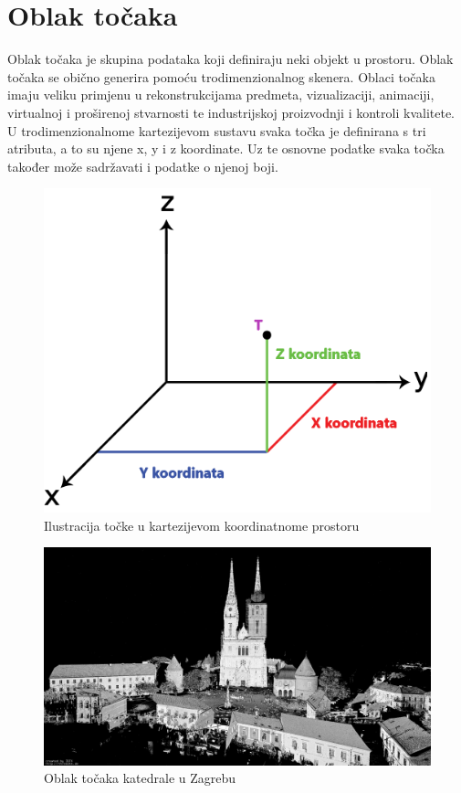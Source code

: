 \section{Oblak točaka}

Oblak točaka je skupina podataka koji definiraju neki objekt u prostoru. Oblak točaka se obično generira pomoću trodimenzionalnog skenera. Oblaci točaka imaju veliku primjenu u rekonstrukcijama predmeta, vizualizaciji, animaciji, virtualnoj i proširenoj stvarnosti te industrijskoj proizvodnji i kontroli kvalitete. U trodimenzionalnome kartezijevom sustavu svaka točka je definirana s tri atributa, a to su njene x, y i z koordinate. Uz te osnovne podatke svaka točka također može sadržavati i podatke o njenoj boji.

\begin{figure}[h!]
  \centering
  \includegraphics[scale=0.3]{images/point-coordinates.png}
  \caption{Ilustracija točke u kartezijevom koordinatnome prostoru}
  \label{fig:point_coordinates}
\end{figure}

\begin{figure}[h!]
  \centering
  \includegraphics[scale=0.2]{images/katedrala-point-cloud.jpg}
  \caption{Oblak točaka katedrale u Zagrebu\cite{cloud:katedrala}}
  \label{fig:point_cloud_exmaple}
\end{figure}

